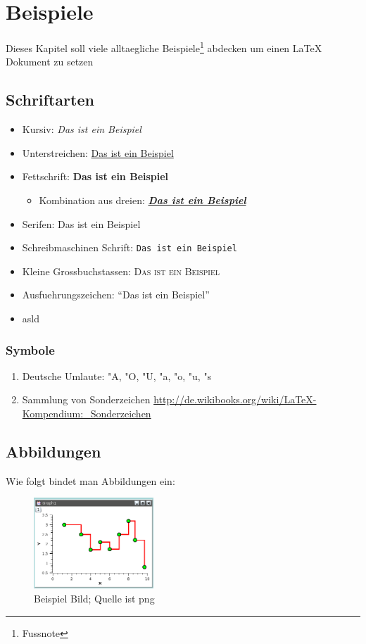 
\chapter{Beispiele}
\label{cha:beispiele}
	Dieses Kapitel soll viele alltaegliche Beispiele\footnote{Fussnote} abdecken um einen {\LaTeX} Dokument zu setzen

		\section{Schriftarten}
		\label{sec:schriftarten} 
			\begin{itemize}
				\item Kursiv: \emph{Das ist ein Beispiel}
				\item Unterstreichen: \underline{Das ist ein Beispiel}
				\item Fettschrift: \textbf{Das ist ein Beispiel}
				\begin{itemize} 
					\item Kombination aus dreien: \underline{\textbf{\emph{Das ist ein Beispiel}}}						\end{itemize} 
				\item Serifen: \textsf{Das ist ein Beispiel}
				\item Schreibmaschinen Schrift: \texttt{Das ist ein Beispiel}
				\item Kleine Grossbuchstassen: \textsc{Das ist ein Beispiel}
				\item Ausfuehrungszeichen: ``Das ist ein Beispiel''
				\item asld
			\end{itemize}
			
		
			\subsection{Symbole}
				\begin{enumerate}
				\item Deutsche Umlaute: "A, "O, "U, "a, "o, "u, "s
				\item Sammlung von Sonderzeichen \url{http://de.wikibooks.org/wiki/LaTeX-Kompendium:_Sonderzeichen}
				\end{enumerate}
				

	\section{Abbildungen}
		Wie folgt bindet man Abbildungen ein:
		\begin{figure}[htb]
		 \centering
		 \includegraphics[width=0.4\textwidth,angle=0]{abb/beispiel}
 		\caption{Beispiel Bild; Quelle ist png}
		\label{fig:beispiel}
		\end{figure}
	
